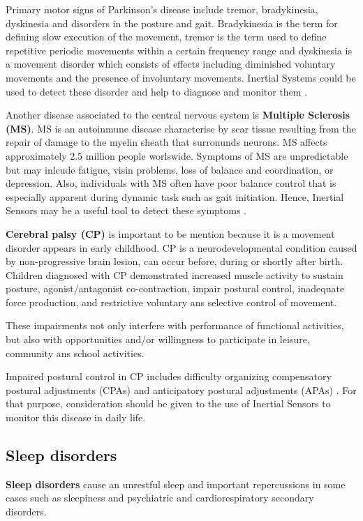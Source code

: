 Primary motor signs of Parkinson’s disease include tremor, bradykinesia, dyskinesia and disorders in the posture and gait. Bradykinesia is the term for defining slow execution of the movement, tremor is the term used to define repetitive periodic movements within a certain frequency range and dyskinesia is a movement disorder which consists of effects including diminished voluntary movements and the presence of involuntary movements. Inertial Systems could be used to detect these disorder and help to diagnose and monitor them \cite{A.Olivares2013}.

Another disease associated to the central nervous system is \textbf{Multiple Sclerosis (MS)}. MS is an autoinmune disease characterise by scar tissue resulting from the repair of damage to the myelin sheath that surronunds neurons. MS affects approximately 2.5 million people worlswide. Symptoms of MS are unpredictable but may inlcude fatigue, visin problems, loss of balance and coordination, or depression. Also, individuals with MS often have poor balance control that is especially apparent during dynamic task such as gait initiation. Hence, Inertial Sensors may be a useful tool to detect these symptoms \cite{Jebb2008}.


\textbf{Cerebral  palsy (CP)} is important to be mention  because it is a movement disorder appears in early childhood. CP is a neurodevelopmental condition caused by non-progressive brain lesion, can occur before, during or shortly after birth. Children diagnosed with CP demonstrated increased muscle activity to sustain posture, agonist/antagonist co-contraction, impair postural control, inadequate force production, and restrictive voluntary ans selective control of movement\cite{Gay2011}.

These impairments not only interfere with performance of functional activities, but also with opportunities  and/or willingness to participate in leisure, community ans school activities.

Impaired postural control in CP includes difficulty organizing compensatory postural adjustments (CPAs) and anticipatory postural adjustments (APAs) \cite{Gay2011}. For that purpose,  consideration should be given to the use of Inertial Sensors to monitor this disease in daily life.
\vfill

\subsection{Sleep disorders}
\textbf{Sleep disorders} cause an unrestful sleep and important repercussions in some cases such as sleepiness and psychiatric and cardiorespiratory secondary disorders\cite{SanchezDaniel}. 

